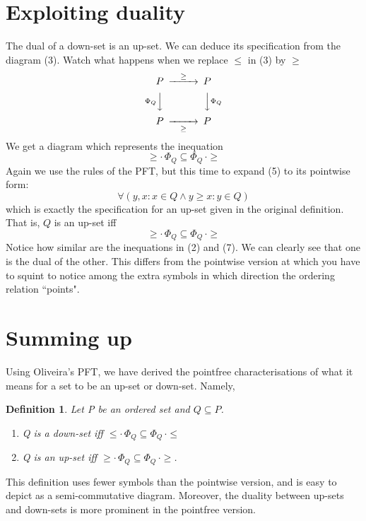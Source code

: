 \documentclass{article}
\newtheorem*{defn}{Definition}
\begin{document}
\section{Exploiting duality}
The dual of a down-set is an up-set.  We can deduce its specification from the diagram (3). Watch what happens when we replace $\leq$ in (3) by $\geq$
\begin{equation}
\begin{CD}
P  @>\geq>> P \\
@V\Phi_{Q}VV       @VV\Phi_{Q}V \\
P  @>>\geq> P
\end{CD}    
\end{equation}
We get a diagram which represents the inequation
\begin{equation}
    \geq \cdot \, \Phi_{Q} \subseteq \Phi_{Q} \, \cdot \geq
\end{equation}
Again we use the rules of the PFT, but this time to expand (5) to its pointwise form:
\begin{equation}
    \forall( y,x : x \in Q \wedge y \geq x : y \in Q )
\end{equation}
which is exactly the specification for an up-set given in the original definition.
That is, $Q$ is an up-set iff
\begin{equation}
    \geq \cdot \, \Phi_{Q} \subseteq \Phi_{Q} \, \cdot \geq
\end{equation}
Notice how similar are the inequations in (2) and (7).  We can clearly see that one is the dual of the other.  This differs from the pointwise version at which you have to squint to notice among the extra symbols in which direction the ordering relation ``points".  

\section{Summing up}
Using Oliveira's PFT, we have derived the pointfree characterisations of what it means for a set to be an up-set or down-set. Namely,
\begin{defn}
Let P be an ordered set and $Q \subseteq P$.
\begin{enumerate}
    \item Q is a down-set iff $\leq \cdot \, \Phi_{Q} \subseteq \Phi_{Q} \, \cdot \leq$
    \item Q is an up-set iff $\geq \cdot \, \Phi_{Q} \subseteq \Phi_{Q} \, \cdot \geq$.
\end{enumerate}
\end{defn}
This definition uses fewer symbols than the pointwise version, and is easy to depict as a semi-commutative diagram.  Moreover, the duality between up-sets and down-sets is more prominent in the pointfree version.


\end{document}
